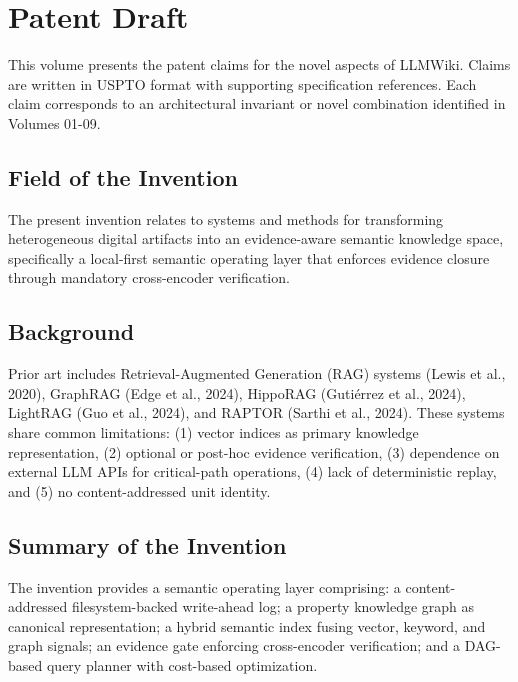 ﻿%
\chapter{Patent Draft}
\label{cha:patent}

This volume presents the patent claims for the novel aspects of LLMWiki. Claims are written in USPTO format with supporting specification references. Each claim corresponds to an architectural invariant or novel combination identified in Volumes 01-09.

\section{Field of the Invention}
\label{sec:patent:field}

The present invention relates to systems and methods for transforming heterogeneous digital artifacts into an evidence-aware semantic knowledge space, specifically a local-first semantic operating layer that enforces evidence closure through mandatory cross-encoder verification.

\section{Background}
\label{sec:patent:background}

Prior art includes Retrieval-Augmented Generation (RAG) systems (Lewis et al., 2020), GraphRAG (Edge et al., 2024), HippoRAG (Guti{\'e}rrez et al., 2024), LightRAG (Guo et al., 2024), and RAPTOR (Sarthi et al., 2024). These systems share common limitations: (1) vector indices as primary knowledge representation, (2) optional or post-hoc evidence verification, (3) dependence on external LLM APIs for critical-path operations, (4) lack of deterministic replay, and (5) no content-addressed unit identity.

\section{Summary of the Invention}
\label{sec:patent:summary}

The invention provides a semantic operating layer comprising: a content-addressed filesystem-backed write-ahead log; a property knowledge graph as canonical representation; a hybrid semantic index fusing vector, keyword, and graph signals; an evidence gate enforcing cross-encoder verification; and a DAG-based query planner with cost-based optimization.

